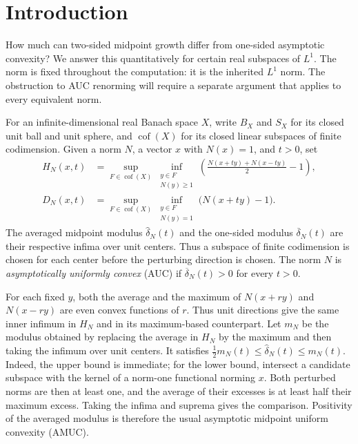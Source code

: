\section{Introduction}

How much can two-sided midpoint growth differ from one-sided asymptotic
convexity?  We answer this quantitatively for certain real subspaces of
$L^1$.  The norm is fixed throughout the computation: it is the inherited
$L^1$ norm.  The obstruction to AUC renorming will require a separate
argument that applies to every equivalent norm.

For an infinite-dimensional real Banach space $X$, write $B_X$ and $S_X$
for its closed unit ball and unit sphere, and
$\operatorname{cof}(X)$ for its closed linear subspaces of finite
codimension.  Given a norm $N$, a vector $x$ with $N(x)=1$, and $t>0$, set
\begin{align*}
 H_N(x,t)&=\sup_{F\in\operatorname{cof}(X)}
   \inf_{\substack{y\in F\\N(y)\ge1}}
   \left(\frac{N(x+ty)+N(x-ty)}2-1\right),\\
 D_N(x,t)&=\sup_{F\in\operatorname{cof}(X)}
   \inf_{\substack{y\in F\\N(y)=1}}\bigl(N(x+ty)-1\bigr).
\end{align*}
The averaged midpoint modulus $\widehat\delta_N(t)$ and the one-sided
modulus $\overline\delta_N(t)$ are their respective infima over unit
centers.  Thus a subspace of finite codimension is chosen for each center
before the perturbing direction is chosen.  The norm $N$ is
\emph{asymptotically uniformly convex} (AUC) if
$\overline\delta_N(t)>0$ for every $t>0$.

For each fixed $y$, both the average and the maximum of $N(x+ry)$ and
$N(x-ry)$ are even convex functions of $r$.  Thus unit directions give
the same inner infimum in $H_N$ and in its maximum-based counterpart.  Let $m_N$ be the modulus obtained by replacing the average in $H_N$ by
the maximum and then taking the infimum over unit centers.  It satisfies
$\tfrac12m_N(t)\le\widehat\delta_N(t)\le m_N(t)$.
Indeed, the upper bound is immediate; for the lower bound, intersect a
candidate subspace with the kernel of a norm-one functional norming $x$.
Both perturbed norms are then at least one, and the average of their
excesses is at least half their maximum excess.  Taking the infima and
suprema gives the comparison.  Positivity of the averaged modulus is
therefore the usual asymptotic midpoint uniform convexity (AMUC).

